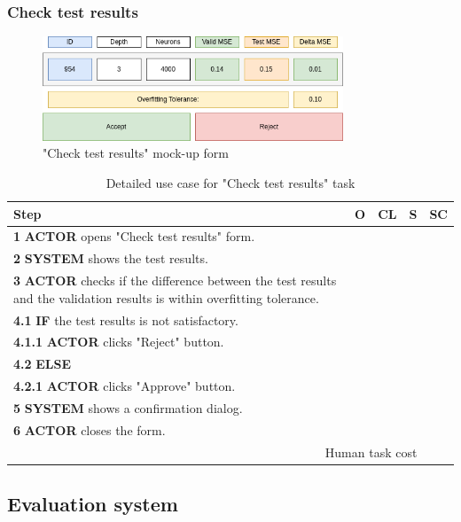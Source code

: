 \subsubsection{Check test results}

\begin{figure}[H]
\centering
\includegraphics[width=0.8\textwidth]{figures/check_test_results.png}
\caption{"Check test results" mock-up form}
\end{figure}

\begin{table}[H]
\centering
\begin{tabularx}{\textwidth}{|X|c|c|c|c|}
\hline
\textbf{Step} & \textbf{O} & \textbf{CL} & \textbf{S} & \textbf{SC} \\
\hline
\textbf{1} \textbf{ACTOR} opens "Check test results" form. & & & & \\
\hline
\textbf{2} \textbf{SYSTEM} shows the test results. & & & & \\
\hline
\textbf{3} \textbf{ACTOR} checks if the difference between the test results and the validation results is within overfitting tolerance. & & & & \\
\hline
\textbf{4.1} \textbf{IF} the test results is not satisfactory. & & & & \\
\hline
\textbf{4.1.1} \textbf{ACTOR} clicks "Reject" button. & & & & \\
\hline
\textbf{4.2} \textbf{ELSE} & & & & \\
\hline
\textbf{4.2.1} \textbf{ACTOR} clicks "Approve" button. & & & & \\
\hline
\textbf{5} \textbf{SYSTEM} shows a confirmation dialog. & & & & \\
\hline
\textbf{6} \textbf{ACTOR} closes the form. & & & & \\
\hline
\multicolumn{4}{|r|}{Human task cost} & \\
\hline
\end{tabularx}
\caption{Detailed use case for "Check test results" task}
\label{table:check_test_results}
\end{table}


\subsection{Evaluation system}

